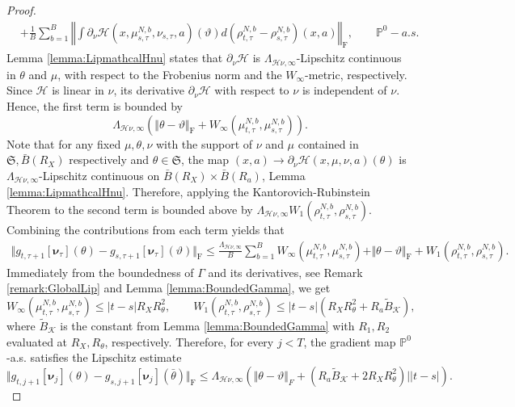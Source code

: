 \documentclass{article}
\begin{document}
\begin{appendices}
\begin{proof}
\begin{align*}
    & + \frac{1}{B}\sum_{b=1}^B\left\Vert \int \partial_\nu\mathcal H(x,\mu^{N,b}_{s,\tau},\nu_{s,\tau},a)(\vartheta)d(\rho^{N,b}_{t,\tau}-\rho^{N,b}_{s,\tau})(x,a)\right\Vert_\mathrm{F}, \qquad \mathbb P^0-a.s.
\end{align*}
Lemma \ref{lemma:LipmathcalHnu} states that $\partial_\nu\mathcal H$ is $\Lambda_{\mathcal H\nu,\infty}$-Lipschitz continuous in $\theta$ and $\mu$, with respect to the Frobenius norm and the $W_\infty$-metric, respectively. Since $\mathcal H$ is linear in $\nu$, its derivative $\partial_\nu\mathcal H$ with respect to $\nu$ is independent of $\nu$. Hence, the first term is bounded by \[
\Lambda_{\mathcal H\nu,\infty} \left(\Vert \theta-\vartheta\Vert_\mathrm{F}+W_\infty(\mu^{N,b}_{t,\tau},\mu^{N,b}_{s,\tau})\right).\]
Note that for any fixed $\mu,\theta,\nu$ with the support of $\nu$ and $\mu$ contained in $\mathfrak{S},\bar B(R_X)$ respectively and $\theta \in \mathfrak{S}$, the map $(x,a)\to \partial_\nu\mathcal H(x,\mu,\nu,a)(\theta)$ is $\Lambda_{\mathcal H\nu,\infty}$-Lipschitz continuous on $\bar B(R_X)\times \bar B(R_a)$, Lemma \ref{lemma:LipmathcalHnu}. Therefore, applying the Kantorovich-Rubinstein Theorem \cite{villani2008optimal} to the second term is bounded above by $\Lambda_{\mathcal H\nu,\infty}W_1(\rho^{N,b}_{t,\tau},\rho^{N,b}_{s,\tau})$. Combining the contributions from each term yields that
\begin{align*}
    \Vert g_{t,\tau+1}[\bm\nu_\tau](\theta)-g_{s,\tau+1}[\bm\nu_\tau](\vartheta)\Vert_\mathrm{F} 
    \le\frac{\Lambda_{\mathcal H\nu,\infty}}{B}\sum_{b=1}^B  W_\infty(\mu^{N,b}_{t,\tau}, \mu^{N,b}_{s,\tau})+\Vert \theta- \vartheta\Vert_\mathrm{F} +  W_1(\rho^{N,b}_{t,\tau},\rho^{N,b}_{s,\tau}).
\end{align*}
Immediately from the boundedness of $\Gamma$ and its derivatives, see Remark \ref{remark:GlobalLip} and Lemma \ref{lemma:BoundedGamma}, we get
\[
W_\infty(\mu^{N,b}_{t,\tau}, \mu^{N,b}_{s,\tau}) \le |t-s|R_XR_\theta^2, \qquad  W_1(\rho^{N,b}_{t,\tau},\rho^{N,b}_{s,\tau}) \le |t-s| (R_XR_\theta^2+R_a \tilde{B}_\mathcal{K}),
\]
where $\tilde{B}_\mathcal{K}$ is the constant from Lemma \ref{lemma:BoundedGamma} with $R_1,R_2$ evaluated at $R_X,R_\theta$, respectively. Therefore, for every $j<T$, the gradient map $\mathbb P^0$-a.s. satisfies the Lipschitz estimate
\begin{equation}\label{eqn:LipGt}
    \Vert g_{t,j+1}[\bm\nu_j](\theta)-g_{s,j+1}[\bm\nu_j](\bar\theta)\Vert_\mathrm{F}\le\Lambda_{\mathcal H\nu,\infty}\left(\Vert \theta-\vartheta\Vert_F+(R_a\tilde{B}_\mathcal{K}+2R_XR_\theta^2)||t-s|\right).

\end{equation}
\end{proof}
\end{appendices}
\end{document}
